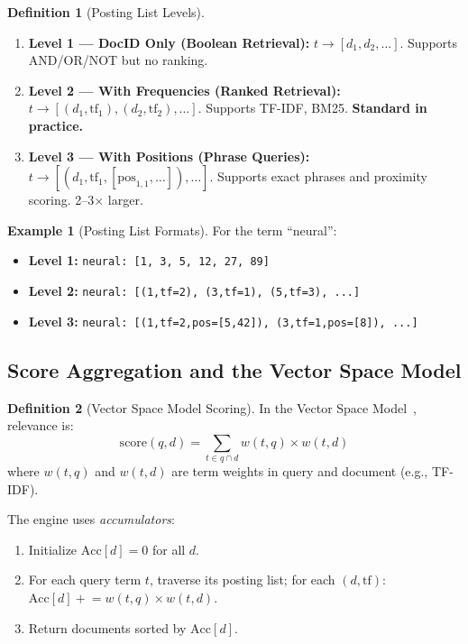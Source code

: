 \documentclass[11pt,a4paper]{article}
\theoremstyle{definition}
\newtheorem{definition}{Definition}[section]
\newtheorem{example}{Example}[section]
\theoremstyle{plain}
\begin{document}
\begin{definition}[Posting List Levels]
\label{def:posting-levels}
\leavevmode
\begin{enumerate}
    \item \textbf{Level 1 --- DocID Only (Boolean Retrieval):} $t \to [d_1, d_2, \ldots]$. Supports AND/OR/NOT but no ranking.
    \item \textbf{Level 2 --- With Frequencies (Ranked Retrieval):} $t \to [(d_1, \mathrm{tf}_1), (d_2, \mathrm{tf}_2), \ldots]$. Supports TF-IDF, BM25. \textbf{Standard in practice.}
    \item \textbf{Level 3 --- With Positions (Phrase Queries):} $t \to [(d_1, \mathrm{tf}_1, [\mathrm{pos}_{1,1}, \ldots]), \ldots]$. Supports exact phrases and proximity scoring. 2--3$\times$ larger.
\end{enumerate}
\end{definition}

\begin{example}[Posting List Formats]
For the term ``neural'':
\begin{itemize}[nosep]
    \item \textbf{Level 1:} \texttt{neural: [1, 3, 5, 12, 27, 89]}
    \item \textbf{Level 2:} \texttt{neural: [(1,tf=2), (3,tf=1), (5,tf=3), ...]}
    \item \textbf{Level 3:} \texttt{neural: [(1,tf=2,pos=[5,42]), (3,tf=1,pos=[8]), ...]}
\end{itemize}
\end{example}

\subsection{Score Aggregation and the Vector Space Model}

\begin{definition}[Vector Space Model Scoring]
\label{def:vsm-scoring}
In the Vector Space Model~\cite{salton1975vector}, relevance is:
\begin{equation}
\mathrm{score}(q, d) = \sum_{t \in q \cap d} w(t, q) \times w(t, d)
\label{eq:vsm}
\end{equation}
where $w(t, q)$ and $w(t, d)$ are term weights in query and document (e.g., TF-IDF).
\end{definition}

The engine uses \emph{accumulators}:
\begin{enumerate}[nosep]
    \item Initialize $\mathrm{Acc}[d] = 0$ for all $d$.
    \item For each query term $t$, traverse its posting list; for each $(d, \mathrm{tf})$: $\mathrm{Acc}[d] \mathrel{+}= w(t,q) \times w(t,d)$.
    \item Return documents sorted by $\mathrm{Acc}[d]$.
\end{enumerate}
\end{document}
